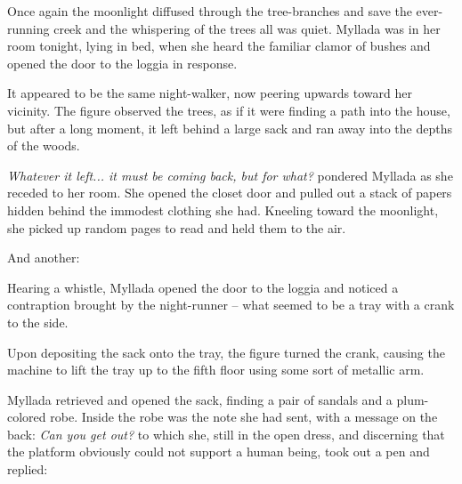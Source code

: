 \centeredstars

Once again the moonlight diffused through the tree-branches and save the ever-running creek and the whispering of the trees all was quiet. Myllada was in her room tonight, lying in bed, when she heard the familiar clamor of bushes and opened the door to the loggia in response.

It appeared to be the same night-walker, now peering upwards toward her vicinity. The figure observed the trees, as if it were finding a path into the house, but after a long moment, it left behind a large sack and ran away into the depths of the woods.

\emph{Whatever it left... it must be coming back, but for what?} pondered Myllada as she receded to her room. She opened the closet door and pulled out a stack of papers hidden behind the immodest clothing she had. Kneeling toward the moonlight, she picked up random pages to read and held them to the air.


And another:


Hearing a whistle, Myllada opened the door to the loggia and noticed a contraption brought by the night-runner -- what seemed to be a tray with a crank to the side.

Upon depositing the sack onto the tray, the figure turned the crank, causing the machine to lift the tray up to the fifth floor using some sort of metallic arm.

Myllada retrieved and opened the sack, finding a pair of sandals and a plum-colored robe. Inside the robe was the note she had sent, with a message on the back: \emph{Can you get out?} to which she, still in the open dress, and discerning that the platform obviously could not support a human being, took out a pen and replied:

